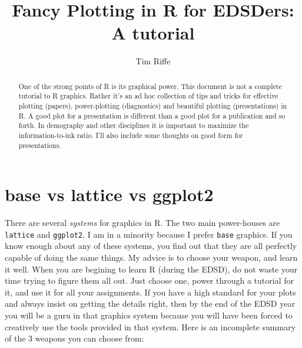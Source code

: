\documentclass[a4paper]{article}
\begin{document}
\title{Fancy Plotting in R for EDSDers: A tutorial}
\author{Tim Riffe}

\maketitle

\begin{abstract}
One of the strong points of R is its graphical power. This document is not a complete tutorial to R graphics. Rather it's an ad hoc collection of tips and tricks for effective plotting (papers), power-plotting (diagnostics) and beautiful plotting (presentations) in R. A good plot for a presentation is different than a good plot for a publication and so forth. In demography and other disciplines it is important to maximize the information-to-ink ratio. I'll also include some thoughts on good form for presentations.
\end{abstract}

\section{base vs lattice vs ggplot2}
There are several \textit{systems} for graphics in R. The two main power-houses are \texttt{lattice} and \texttt{ggplot2}. I am in a minority because I prefer \texttt{base} graphics. If you know enough about any of these systems, you find out that they are all perfectly capable of doing the same things. My advice is to choose your weapon, and learn it well. When you are begining to learn R (during the EDSD), do not waste your time trying to figure them all out. Just choose one,  power through a tutorial for it, and use it for all your assignments. If you have a high standard for your plots and always insist on getting the details right, then by the end of the EDSD year you will be a guru in that graphics system because you will have been forced to creatively use the tools provided in that system. Here is an incomplete summary of the 3 weapons you can choose from:
\end{document}
